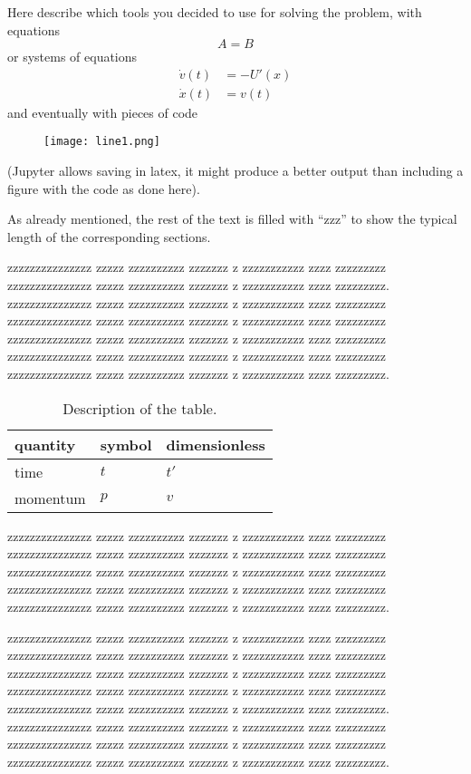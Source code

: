 Here describe which tools you decided to use for solving the problem, with
 equations
\begin{equation}
  A=B
  \label{eq:simple}
\end{equation}
or systems of equations
\begin{align}
  \dot v(t) & =  -U'(x)\nonumber \\
  \dot x(t) & =  v(t)
  \label{eq:motion}
\end{align}
and  eventually with  pieces of code
\begin{figure}[h]
  \texttt{[image: line1.png]}
\end{figure}
(Jupyter allows saving in latex, it might produce a better output than including a figure with the code as done here).

  As already mentioned, the rest of the text is filled with ``zzz'' to show the typical length of the corresponding sections.


  zzzzzzzzzzzzzzz zzzzz zzzzzzzzzz zzzzzzz z zzzzzzzzzzz zzzz zzzzzzzzz
  zzzzzzzzzzzzzzz zzzzz zzzzzzzzzz zzzzzzz z zzzzzzzzzzz zzzz zzzzzzzzz.
  zzzzzzzzzzzzzzz zzzzz zzzzzzzzzz zzzzzzz z zzzzzzzzzzz zzzz zzzzzzzzz
  zzzzzzzzzzzzzzz zzzzz zzzzzzzzzz zzzzzzz z zzzzzzzzzzz zzzz zzzzzzzzz
  zzzzzzzzzzzzzzz zzzzz zzzzzzzzzz zzzzzzz z zzzzzzzzzzz zzzz zzzzzzzzz
  zzzzzzzzzzzzzzz zzzzz zzzzzzzzzz zzzzzzz z zzzzzzzzzzz zzzz zzzzzzzzz
  zzzzzzzzzzzzzzz zzzzz zzzzzzzzzz zzzzzzz z zzzzzzzzzzz zzzz zzzzzzzzz.


  
\begin{table}[!b]
\begin{center}
\begin{tabular}{lll}
quantity & symbol & dimensionless \\
\hline
time & $t$ & $t'$  \\
momentum & $p$ & $v$
\end{tabular}
\end{center}
\caption{Description of the table.}
\label{tab:1}
\end{table}


  
  zzzzzzzzzzzzzzz zzzzz zzzzzzzzzz zzzzzzz z zzzzzzzzzzz zzzz zzzzzzzzz
  zzzzzzzzzzzzzzz zzzzz zzzzzzzzzz zzzzzzz z zzzzzzzzzzz zzzz zzzzzzzzz
  zzzzzzzzzzzzzzz zzzzz zzzzzzzzzz zzzzzzz z zzzzzzzzzzz zzzz zzzzzzzzz
  zzzzzzzzzzzzzzz zzzzz zzzzzzzzzz zzzzzzz z zzzzzzzzzzz zzzz zzzzzzzzz
  zzzzzzzzzzzzzzz zzzzz zzzzzzzzzz zzzzzzz z zzzzzzzzzzz zzzz zzzzzzzzz.


  zzzzzzzzzzzzzzz zzzzz zzzzzzzzzz zzzzzzz z zzzzzzzzzzz zzzz zzzzzzzzz
  zzzzzzzzzzzzzzz zzzzz zzzzzzzzzz zzzzzzz z zzzzzzzzzzz zzzz zzzzzzzzz
  zzzzzzzzzzzzzzz zzzzz zzzzzzzzzz zzzzzzz z zzzzzzzzzzz zzzz zzzzzzzzz
  zzzzzzzzzzzzzzz zzzzz zzzzzzzzzz zzzzzzz z zzzzzzzzzzz zzzz zzzzzzzzz
  zzzzzzzzzzzzzzz zzzzz zzzzzzzzzz zzzzzzz z zzzzzzzzzzz zzzz zzzzzzzzz.
  zzzzzzzzzzzzzzz zzzzz zzzzzzzzzz zzzzzzz z zzzzzzzzzzz zzzz zzzzzzzzz
  zzzzzzzzzzzzzzz zzzzz zzzzzzzzzz zzzzzzz z zzzzzzzzzzz zzzz zzzzzzzzz
  zzzzzzzzzzzzzzz zzzzz zzzzzzzzzz zzzzzzz z zzzzzzzzzzz zzzz zzzzzzzzz.